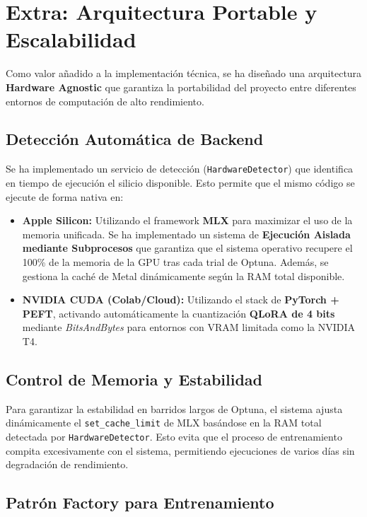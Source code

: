 \section{Extra: Arquitectura Portable y Escalabilidad}

Como valor añadido a la implementación técnica, se ha diseñado una arquitectura \textbf{Hardware Agnostic} que garantiza la portabilidad del proyecto entre diferentes entornos de computación de alto rendimiento.

\subsection{Detección Automática de Backend}

Se ha implementado un servicio de detección (\texttt{HardwareDetector}) que identifica en tiempo de ejecución el silicio disponible. Esto permite que el mismo código se ejecute de forma nativa en:
\begin{itemize}
    \item \textbf{Apple Silicon:} Utilizando el framework \textbf{MLX} para maximizar el uso de la memoria unificada. Se ha implementado un sistema de \textbf{Ejecución Aislada mediante Subprocesos} que garantiza que el sistema operativo recupere el 100\% de la memoria de la GPU tras cada trial de Optuna. Además, se gestiona la caché de Metal dinámicamente según la RAM total disponible.
    \item \textbf{NVIDIA CUDA (Colab/Cloud):} Utilizando el stack de \textbf{PyTorch + PEFT}, activando automáticamente la cuantización \textbf{QLoRA de 4 bits} mediante \textit{BitsAndBytes} para entornos con VRAM limitada como la NVIDIA T4.
\end{itemize}

    \subsection{Control de Memoria y Estabilidad}

    Para garantizar la estabilidad en barridos largos de Optuna, el sistema ajusta dinámicamente el \texttt{set\_cache\_limit} de MLX basándose en la RAM total detectada por \texttt{HardwareDetector}. Esto evita que el proceso de entrenamiento compita excesivamente con el sistema, permitiendo ejecuciones de varios días sin degradación de rendimiento.


\subsection{Patrón Factory para Entrenamiento}

